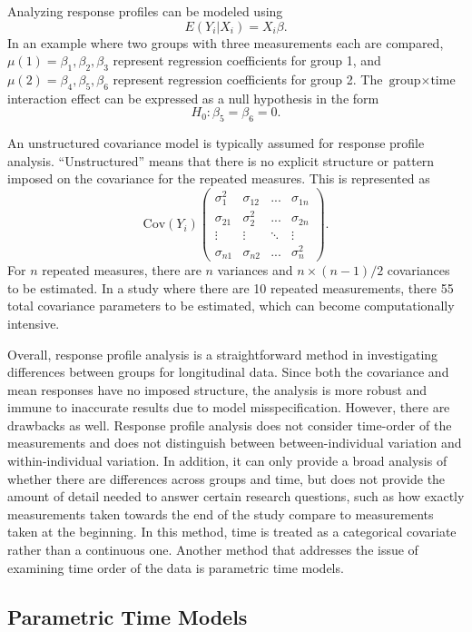 \documentclass[12pt, twoside]{amherstthesis}
\begin{document}
Analyzing response profiles can be modeled using \[E(Y_i|X_i) = X_i\beta.\] In an example where two groups with three measurements each are compared, \(\mu(1) = \beta_1,\beta_2,\beta_3\) represent regression coefficients for group 1, and \(\mu(2) = \beta_4,\beta_5,\beta_6\) represent regression coefficients for group 2. The \(\text{group} \times \text{time}\) interaction effect can be expressed as a null hypothesis in the form \[H_0: \beta_5 =\beta_6=0.\]

An unstructured covariance model is typically assumed for response profile analysis. ``Unstructured'' means that there is no explicit structure or pattern imposed on the covariance for the repeated measures. This is represented as \[\text{Cov}(Y_i) \begin{pmatrix} \sigma_1^2 &\sigma_{12} & ...& \sigma_{1n} \\ \sigma_{21} &\sigma_2^2 & ... & \sigma_{2n} \\ \vdots & \vdots & \ddots & \vdots \\ \sigma_{n1} & \sigma_{n2} & ... & \sigma_n^2\end{pmatrix}.\] For \(n\) repeated measures, there are \(n\) variances and \(n \times (n-1)/2\) covariances to be estimated. In a study where there are 10 repeated measurements, there 55 total covariance parameters to be estimated, which can become computationally intensive.

Overall, response profile analysis is a straightforward method in investigating differences between groups for longitudinal data. Since both the covariance and mean responses have no imposed structure, the analysis is more robust and immune to inaccurate results due to model misspecification. However, there are drawbacks as well. Response profile analysis does not consider time-order of the measurements and does not distinguish between between-individual variation and within-individual variation. In addition, it can only provide a broad analysis of whether there are differences across groups and time, but does not provide the amount of detail needed to answer certain research questions, such as how exactly measurements taken towards the end of the study compare to measurements taken at the beginning. In this method, time is treated as a categorical covariate rather than a continuous one. Another method that addresses the issue of examining time order of the data is parametric time models.

\hypertarget{parametric-time-models}{%
\subsection{Parametric Time Models}\label{parametric-time-models}}
\end{document}
